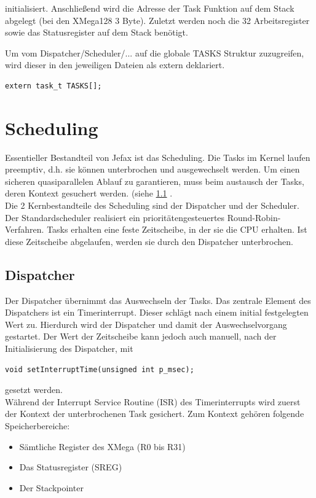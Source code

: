 \documentclass[fontsize=12pt, toc=bibliography, notitlepage]{scrreprt}
\newcommand{\refnn}[1]{\ref{#1} \nameref{#1}}
\begin{document}
initialisiert. Anschließend wird die Adresse der Task Funktion auf dem Stack abgelegt (bei den XMega128 3 Byte). Zuletzt werden noch die 32 Arbeitsregister sowie das Statusregister auf dem Stack benötigt.

Um vom Dispatcher/Scheduler/... auf die globale TASKS Struktur zuzugreifen, wird dieser in den jeweiligen Dateien als extern deklariert.

\begin{lstlisting}
extern task_t TASKS[];
\end{lstlisting}

\chapter{Scheduling}
\label{chap:scheduling}
Essentieller Bestandteil von Jefax ist das Scheduling. Die Tasks im Kernel laufen preemptiv, d.h. sie können unterbrochen und ausgewechselt werden. Um einen sicheren quasiparallelen Ablauf zu garantieren, muss beim austausch der Tasks, deren Kontext gesuchert werden. (siehe \refnn{sec:dispatcher}.\\
Die 2 Kernbestandteile des Scheduling sind der Dispatcher und der Scheduler. Der Standardscheduler realisiert ein prioritätengesteuertes Round-Robin-Verfahren. Tasks erhalten eine feste Zeitscheibe, in der sie die CPU erhalten. Ist diese Zeitscheibe abgelaufen, werden sie durch den Dispatcher unterbrochen.

\section{Dispatcher}
\label{sec:dispatcher}
Der Dispatcher übernimmt das Auswechseln der Tasks. Das zentrale Element des Dispatchers ist ein Timerinterrupt. Dieser schlägt nach einem initial festgelegten Wert zu. Hierdurch wird der Dispatcher und damit der Auswechselvorgang gestartet. Der Wert der Zeitscheibe kann jedoch auch manuell, nach der Initialisierung des Dispatcher, mit

\begin{lstlisting}
void setInterruptTime(unsigned int p_msec);
\end{lstlisting}

gesetzt werden.\\
Während der Interrupt Service Routine (ISR) des Timerinterrupts wird zuerst der Kontext der unterbrochenen Task gesichert. Zum Kontext gehören folgende Speicherbereiche:

\begin{itemize}
	\item Sämtliche Register des XMega (R0 bis R31)
	\item Das Statusregister (SREG)
	\item Der Stackpointer
\end{itemize}
\end{document}
